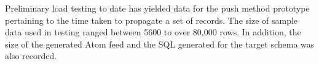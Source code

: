 \documentclass{CRPITStyle}
\begin{document}
Preliminary load testing to date has yielded data for the push method
prototype pertaining to the time taken to propagate a set of records.
The size of sample data used in testing ranged between 5600 to over 
80,000 rows. In addition, the size of the generated Atom feed and the 
SQL generated for the target schema was also recorded.


%
%
%
%
\end{document}
